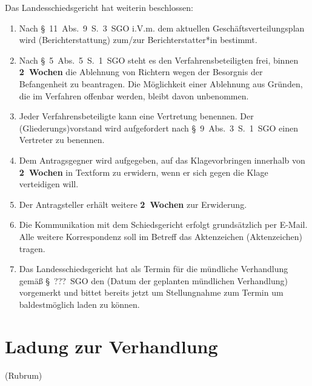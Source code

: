 Das Landesschiedsgericht hat weiterin beschlossen:
\begin{enumerate}
\item Nach §~11~Abs.~9~S.~3~SGO i.V.m. dem aktuellen Geschäftsverteilungsplan wird (Berichterstattung) zum/zur Berichterstatter*in bestimmt.
\item Nach §~5~Abs.~5~S.~1~SGO steht es den Verfahrensbeteiligten frei, binnen \textbf{2~Wochen} die Ablehnung von Richtern wegen der Besorgnis der Befangenheit zu beantragen. Die Möglichkeit einer Ablehnung aus Gründen, die im Verfahren offenbar werden, bleibt davon unbenommen.
\item Jeder Verfahrensbeteiligte kann eine Vertretung benennen. Der (Gliederungs)vorstand wird aufgefordert nach §~9~Abs.~3~S.~1~SGO einen Vertreter zu benennen.
\item Dem Antragsgegner wird aufgegeben, auf das Klagevorbringen innerhalb von \textbf{2~Wochen} in Textform zu erwidern, wenn er sich gegen die Klage verteidigen will.
\item Der Antragsteller erhält weitere \textbf{2~Wochen} zur Erwiderung.
\item Die Kommunikation mit dem Schiedsgericht erfolgt grundsätzlich per E-Mail. Alle weitere Korrespondenz soll im Betreff das Aktenzeichen (Aktenzeichen) tragen.
\item Das Landesschiedsgericht hat als Termin für die mündliche Verhandlung gemäß \S~???~SGO den (Datum der geplanten mündlichen Verhandlung) vorgemerkt und bittet bereits jetzt um Stellungnahme zum Termin um baldestmöglich laden zu können.
\end{enumerate}


\section{Ladung zur Verhandlung}
\label{Vorlage:Verhandlungsladung}
(Rubrum)

